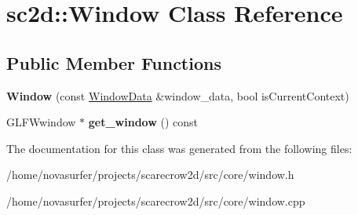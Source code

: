 \hypertarget{classsc2d_1_1Window}{}\section{sc2d\+:\+:Window Class Reference}
\label{classsc2d_1_1Window}
\subsection*{Public Member Functions}
\begin{DoxyCompactItemize}
\item 
\mbox{\label{classsc2d_1_1Window_a57eae413436389086cab23df70c1ee5f}} 
{\bfseries Window} (const \hyperlink{structsc2d_1_1WindowData}{Window\+Data} \&window\+\_\+data, bool is\+Current\+Context)
\item 
\mbox{\label{classsc2d_1_1Window_a3ec821ef0028b7b6a98b3931d44c95c8}} 
G\+L\+F\+Wwindow $\ast$ {\bfseries get\+\_\+window} () const
\end{DoxyCompactItemize}


The documentation for this class was generated from the following files\+:\begin{DoxyCompactItemize}
\item 
/home/novasurfer/projects/scarecrow2d/src/core/window.\+h\item 
/home/novasurfer/projects/scarecrow2d/src/core/window.\+cpp\end{DoxyCompactItemize}
